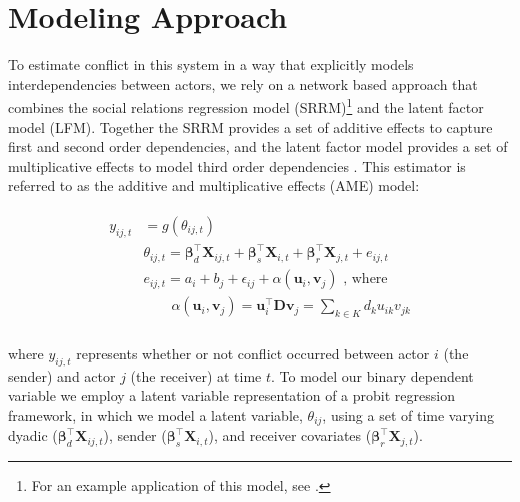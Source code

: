 \section*{Modeling Approach}

To estimate conflict in this system in a way that explicitly models interdependencies between actors, we rely on a network based approach that combines the social relations regression model (SRRM)\footnote{For an example application of this model, see \citet{dorff:minhas:2017}.} and the latent factor model (LFM). Together the SRRM provides a set of additive effects to capture first and second order dependencies, and the latent factor model provides a set of multiplicative effects to model third order dependencies \citep{minhas:etal:2018}. This estimator is referred to as the additive and multiplicative effects (AME) model:

\vspace{-10mm}
\begin{align}
	\begin{aligned}
		y_{ij,t} &= g(\theta_{ij,t}) \\ 
		&\theta_{ij,t} = \bm\beta_{d}^{\top} \mathbf{X}_{ij,t} + \bm\beta_{s}^{\top} \mathbf{X}_{i,t} + \bm\beta_{r}^{\top} \mathbf{X}_{j,t} + e_{ij,t} \\
		&e_{ij,t} = a_{i} + b_{j}  + \epsilon_{ij} + \alpha(\textbf{u}_{i}, \textbf{v}_{j}) \text{  , where } \\
		&\qquad \alpha(\textbf{u}_{i}, \textbf{v}_{j}) = \textbf{u}_{i}^{\top} \textbf{D} \textbf{v}_{j} = \sum_{k \in K} d_{k} u_{ik} v_{jk} \\ 
	\label{eqn:ame}
	\end{aligned}
\end{align}

\noindent where $y_{ij,t}$ represents whether or not conflict occurred between actor $i$ (the sender) and actor $j$ (the receiver) at time $t$. To model our binary dependent variable we employ a latent variable representation of a probit regression framework, in which we model a latent variable, $\theta_{ij}$, using a set of time varying dyadic ($\bm\beta_{d}^{\top} \mathbf{X}_{ij,t}$), sender ($\bm\beta_{s}^{\top} \mathbf{X}_{i,t}$), and receiver covariates ($\bm\beta_{r}^{\top} \mathbf{X}_{j,t}$).

